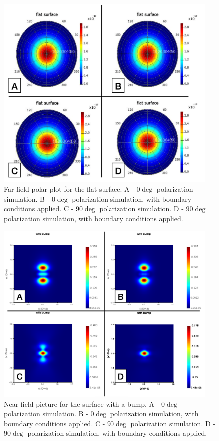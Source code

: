 \documentclass[11pt,a4paper]{article}
\begin{document}
\begin{figure}
        \includegraphics[width=0.95\textwidth]{3.png}
        \caption{Far field polar plot for the flat surface. A - $0\deg$ polarization simulation. B - $0\deg$ polarization simulation, with boundary conditions applied. C - $90\deg$ polarization simulation. D - $90\deg$ polarization simulation, with boundary conditions applied.}
\end{figure}
\begin{figure}
        \includegraphics[width=0.95\textwidth]{4.png}
        \caption{Near field picture for the surface with a bump. A - $0\deg$ polarization simulation. B - $0\deg$ polarization simulation, with boundary conditions applied. C - $90\deg$ polarization simulation. D - $90\deg$ polarization simulation, with boundary conditions applied.}
\end{figure}
\end{document}
